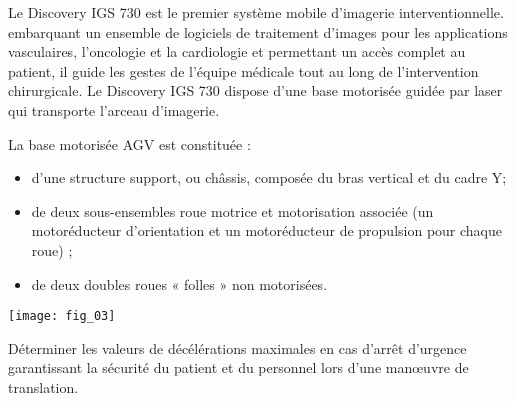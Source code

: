 \ifprof
\else
\begin{multicols}{2}
\fi

Le Discovery IGS 730 est le premier système
mobile d’imagerie interventionnelle. embarquant un ensemble de logiciels de traitement d’images
pour les applications vasculaires, l’oncologie et la cardiologie et permettant un accès complet
au patient, il guide les gestes de l’équipe médicale tout au long de l’intervention chirurgicale. Le Discovery IGS 730 dispose d’une base motorisée guidée par laser qui transporte l’arceau d’imagerie.
%


La base motorisée AGV est constituée :
\begin{itemize}
\item d’une structure support, ou châssis, composée du bras vertical et du cadre Y;
\item de deux sous-ensembles roue motrice et motorisation associée (un motoréducteur d’orientation
et un motoréducteur de propulsion pour chaque roue) ;
\item de deux doubles roues « folles » non motorisées.
\end{itemize}

\begin{center}
\texttt{[image: fig\_03]}
\end{center}

\begin{obj}
Déterminer les valeurs de décélérations maximales en cas d’arrêt d’urgence garantissant la
sécurité du patient et du personnel lors d’une man\oe{}uvre de translation.
\end{obj}


\end{multicols}
